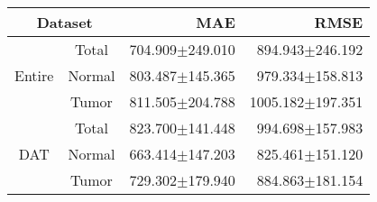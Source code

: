 \begin{tabular}{cc|rr}
\multicolumn{2}{c|}{Dataset} & MAE & RMSE \\ \hline
\multirow{3}{*}{Entire} & Total & 704.909$\pm$249.010 & 894.943$\pm$246.192 \\
 & Normal & 803.487$\pm$145.365 & 979.334$\pm$158.813 \\
 & Tumor & 811.505$\pm$204.788 & 1005.182$\pm$197.351 \\ \hline
\multirow{3}{*}{DAT} & Total & 823.700$\pm$141.448 & 994.698$\pm$157.983 \\
 & Normal & 663.414$\pm$147.203 & 825.461$\pm$151.120 \\
 & Tumor & 729.302$\pm$179.940 & 884.863$\pm$181.154
\end{tabular}
